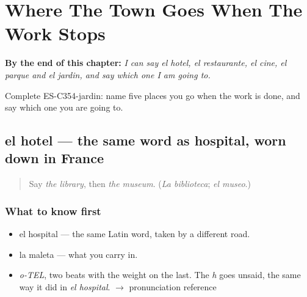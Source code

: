 
\chapter{Where The Town Goes When The Work Stops}
\label{ch:el-hotel-y-el-cine}

\begin{chapteropening}
\textbf{By the end of this chapter:} \emph{I can say el hotel, el restaurante, el cine, el parque and el jardin, and say which one I am going to.}

Complete ES-C354-jardin: name five places you go when the work is done, and say which one you are going to.
\end{chapteropening}

\section[el hotel]{el hotel — the same word as hospital, worn down in France}

\label{lesson:ES-C354-hotel}



\begin{quote}
Say \emph{the library}, then \emph{the museum}. (\emph{La biblioteca}; \emph{el museo}.)
\end{quote}

\subsection*{What to know first}
\begin{itemize}
\raggedright
  \item el hospital — the same Latin word, taken by a different road.
  \item la maleta — what you carry in.
\end{itemize}

\begin{sounds}
\begin{itemize}
\raggedright
  \item \emph{o-TEL}, two beats with the weight on the last. The \emph{h} goes unsaid, the same way it did in \emph{el hospital}. $\to$ pronunciation reference
\end{itemize}
\end{sounds}

